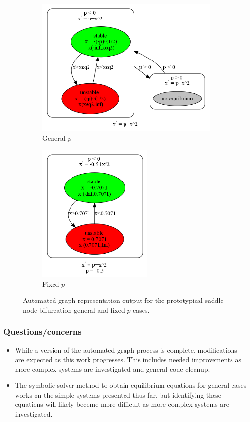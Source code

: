 \documentclass[12pt]{article}
\begin{document}
\begin{figure}[H]
\centering
\begin{subfigure}[b]{0.4\textwidth}
	\centering
	\includegraphics[width=3.75in]{mar03_graph_sn1.png}
	\caption{General $p$}
	\label{mar03_graph_sn1}
\end{subfigure}
\qquad \qquad \qquad
\begin{subfigure}[b]{0.4\textwidth}
	\centering
	\includegraphics[width=2.25in]{mar03_graph_sn2.png}
	\caption{Fixed $p$}
	\label{mar03_graph_sn2}
\end{subfigure}
\caption{Automated graph representation output for the prototypical saddle node bifurcation general and fixed-$p$ cases.}
\label{mar03_graph_sn}
\end{figure}

\subsubsection{Questions/concerns}
\begin{itemize}
\item While a version of the automated graph process is complete, modifications are expected as this work progresses. This includes needed improvements as more complex systems are investigated and general code cleanup.
\item The symbolic solver method to obtain equilibrium equations for general cases works on the simple systems presented thus far, but identifying these equations will likely become more difficult as more complex systems are investigated.
\end{itemize}
\end{document}

